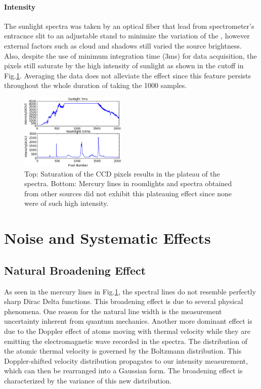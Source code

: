 \documentclass[authoryear,12pt,5p,times]{elsarticle}
\begin{document}
\paragraph*{\textbf{Intensity}}
The sunlight spectra was taken by an optical fiber that lead from spectrometer's entracnce slit to an adjustable stand to minimize the variation of the , however external factors such as cloud and shadows still varied the source brightness. Also,  despite the use of minimum integration time (3ms) for data acquisition,  the pixels still saturate by the high intensity of sunlight as shown in the cutoff in Fig.\ref{sunlight}. Averaging the data does not alleviate the effect since this feature persists throughout the whole duration of taking the 1000 samples. 
 \begin{figure}[h!]
	\includegraphics[width=0.45\textwidth]{figures/sunlight_saturated}
\caption{Top: Saturation of the CCD pixels results in the plateau of the spectra. Bottom: Mercury lines in roomlights and spectra obtained from other sources did not exhibit this plateauing effect since none were of such high intensity.}
\label{sunlight}
	\end{figure}
\section{Noise and Systematic Effects}
	 \subsection{Natural Broadening Effect}
 As seen in the mercury lines in Fig.\ref{sunlight}, the spectral lines do not resemble perfectly sharp Dirac Delta functions. This broadening effect is due to several physical phenomena. One reason for  the natural line width is the measurement uncertainty inherent from quantum mechanics. Another more dominant effect is due to the Doppler effect of atoms moving with thermal velocity while they are emitting the electromagnetic wave recorded in the spectra. The distribution of the atomic thermal velocity is governed by the Boltzmann distribution. This Doppler-shifted velocity distribution propagates to our intensity measurement, which can then be rearranged into a Gaussian form. The broadening effect is characterized by the variance of this new distribution.
\end{document}
